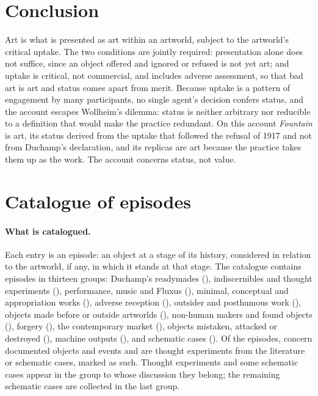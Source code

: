 \documentclass{situationist-preprint}
\begin{document}
\section{Conclusion}\label{s:conclusion}

Art is what is presented as art within an artworld, subject to the artworld's critical uptake. The two conditions are jointly required: presentation alone does not suffice, since an object offered and ignored or refused is not yet art; and uptake is critical, not commercial, and includes adverse assessment, so that bad art is art and status comes apart from merit. Because uptake is a pattern of engagement by many participants, no single agent's decision confers status, and the account escapes Wollheim's dilemma: status is neither arbitrary nor reducible to a definition that would make the practice redundant. On this account \emph{Fountain} is art, its status derived from the uptake that followed the refusal of 1917 and not from Duchamp's declaration, and its replicas are art because the practice takes them up as the work. The account concerns status, not value.

\appendix

\section{Catalogue of episodes}\label{app:catalogue}

\paragraph{What is catalogued.} Each entry is an episode: an object at a stage of its history, considered in relation to the artworld, if any, in which it stands at that stage. The catalogue contains \stnepisodes{} episodes in thirteen groups: Duchamp's readymades (\stgrpR), indiscernibles and thought experiments (\stgrpI), performance, music and Fluxus (\stgrpP), minimal, conceptual and appropriation works (\stgrpM), adverse reception (\stgrpA), outsider and posthumous work (\stgrpO), objects made before or outside artworlds (\stgrpH), non-human makers and found objects (\stgrpN), forgery (\stgrpF), the contemporary market (\stgrpC), objects mistaken, attacked or destroyed (\stgrpD), machine outputs (\stgrpX), and schematic cases (\stgrpS). Of the episodes, \stnreal{} concern documented objects and events and \stnhyp{} are thought experiments from the literature or schematic cases, marked as such. Thought experiments and some schematic cases appear in the group to whose discussion they belong; the remaining schematic cases are collected in the last group.
\end{document}

